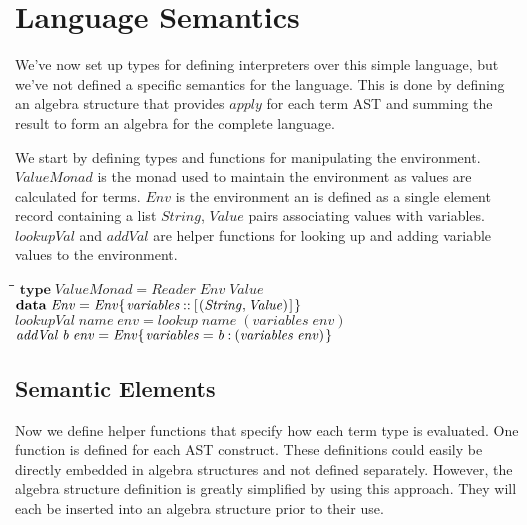 \documentclass[10pt]{article}
\newlength{\lwidth}\setlength{\lwidth}{4.5cm}
\newlength{\cwidth}\setlength{\cwidth}{8mm} %
\newcommand{\Conid}[1]{\mathit{#1}}
\newcommand{\Varid}[1]{\mathit{#1}}
\begin{document}
\section{Language Semantics}

We've now set up types for defining interpreters over this simple
language, but we've not defined a specific semantics for the language.
This is done by defining an algebra structure that provides
\ensuremath{\Varid{apply}} for each term AST and summing the result to form an algebra
for the complete language.

We start by defining types and functions for manipulating the
environment.  \ensuremath{\Conid{ValueMonad}} is the monad used to maintain the
environment as values are calculated for terms.  \ensuremath{\Conid{Env}} is the
environment an is defined as a single element record containing a list
\ensuremath{\Conid{String}}, \ensuremath{\Conid{Value}} pairs associating values with variables.
\ensuremath{\Varid{lookupVal}} and \ensuremath{\Varid{addVal}} are helper functions for looking up and
adding variable values to the environment.

\begin{tabbing}
\qquad\=\hspace{\lwidth}\=\hspace{\cwidth}\=\+\kill
${\mathbf{type}\;\Conid{ValueMonad}\mathrel{=}\Conid{Reader}\;\Conid{Env}\;\Conid{Value}}$\\
${}$\\
${\mathbf{data}\;\Conid{Env}\mathrel{=}\Conid{Env}\{\mskip1.5mu \Varid{variables}\mathbin{::}[\mskip1.5mu (\Conid{String},\Conid{Value})\mskip1.5mu]\mskip1.5mu\}}$\\
${}$\\
${\Varid{lookupVal}\;\Varid{name}\;\Varid{env}\mathrel{=}\Varid{lookup}\;\Varid{name}\;(\Varid{variables}\;\Varid{env})}$\\
${}$\\
${\Varid{addVal}\;\Varid{b}\;\Varid{env}\mathrel{=}\Conid{Env}\{\mskip1.5mu \Varid{variables}\mathrel{=}\Varid{b}\mathbin{:}(\Varid{variables}\;\Varid{env})\mskip1.5mu\}}$
\end{tabbing}
\subsection{Semantic Elements}

Now we define helper functions that specify how each term type is
evaluated.  One function is defined for each AST construct.  These
definitions could easily be directly embedded in algebra structures
and not defined separately.  However, the algebra structure definition
is greatly simplified by using this approach.  They will each be
inserted into an algebra structure prior to their use.
\end{document}

